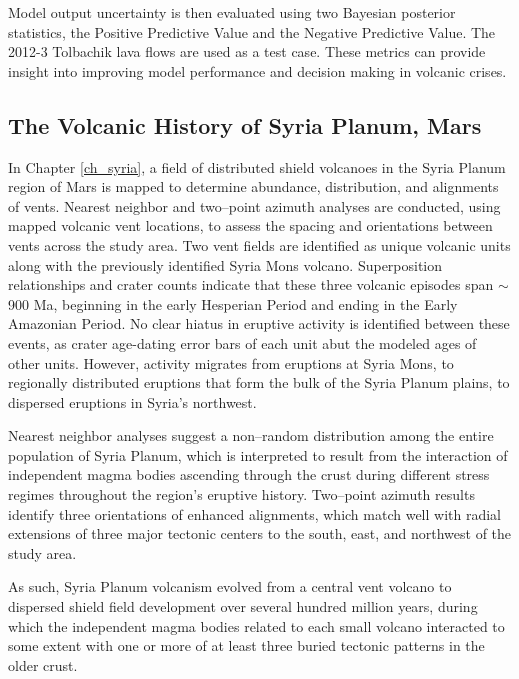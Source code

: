 Model output uncertainty is then evaluated using two Bayesian posterior statistics, the Positive Predictive Value and the Negative Predictive Value. The 2012-3 Tolbachik lava flows are used as a test case. These metrics can provide insight into improving model performance and decision making in volcanic crises.

\subsection{The Volcanic History of Syria Planum, Mars}
In Chapter \ref{ch_syria}, a field of distributed shield volcanoes in the Syria Planum region of Mars is mapped to determine abundance, distribution, and alignments of vents. Nearest neighbor and two--point azimuth analyses are conducted, using mapped volcanic vent locations, to assess the spacing and orientations between vents across the study area. Two vent fields are identified as unique volcanic units along with the previously identified Syria Mons volcano. Superposition relationships and crater counts indicate that these three volcanic episodes span $\sim$900 Ma, beginning in the early Hesperian Period and ending in the Early Amazonian Period. No clear hiatus in eruptive activity is identified between these events, as crater age-dating error bars of each unit abut the modeled ages of other units. However, activity migrates from eruptions at Syria Mons, to regionally distributed eruptions that form the bulk of the Syria Planum plains, to dispersed eruptions in Syria's northwest. 

Nearest neighbor analyses suggest a non--random distribution among the entire population of Syria Planum, which is interpreted to result from the interaction of independent magma bodies ascending through the crust during different stress regimes throughout the region's eruptive history. Two--point azimuth results identify three orientations of enhanced alignments, which match well with radial extensions of three major tectonic centers to the south, east, and northwest of the study area. 

As such, Syria Planum volcanism evolved from a central vent volcano to dispersed shield field development over several hundred million years, during which the independent magma bodies related to each small volcano interacted to some extent with one or more of at least three buried tectonic patterns in the older crust.


